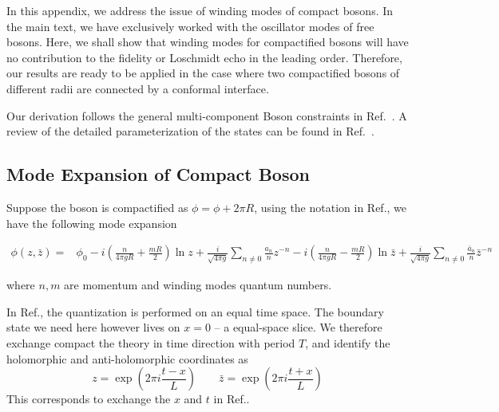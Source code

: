 
In this appendix, we address the issue of winding modes of compact bosons. In the main text, we have exclusively worked with the oscillator modes of free bosons. Here, we shall show that winding modes for compactified bosons will have no contribution to the fidelity or Loschmidt echo in the leading order. Therefore, our results are ready to be applied in the case where two compactified bosons of different radii are connected by a conformal interface\cite{PhysRevLett.118.136801}. 

Our derivation follows the general multi-component Boson constraints in Ref.~. A review of the detailed parameterization of the states can be found in Ref.~. 

\subsection{Mode Expansion of Compact Boson}
Suppose the boson is compactified as $\phi =  \phi + 2\pi R$, using the notation in Ref., we have the following mode expansion 
\begin{widetext}
\begin{equation}
\label{eq:boson-mode-exp}
\begin{aligned}
\phi( z, \bar{z}) = &\phi_0 -i \left( \frac{n}{4\pi g  R} + \frac{m R }{2} \right)  \ln z + \frac{i}{\sqrt{4\pi g}} \sum_{n\ne 0 } \frac{a_n}{n} z^{-n } -i \left( \frac{n}{4\pi g R} - \frac{m R }{2} \right)  \ln \bar{z} + \frac{i}{\sqrt{4\pi g}} \sum_{n\ne 0 } \frac{\bar{a}_n}{n} \bar{z}^{-n } 
\end{aligned}
\end{equation}\end{widetext}
where $n,m$ are momentum and winding modes quantum numbers. 

In Ref., the quantization is performed on an equal time space. The boundary state we need here however lives on $x = 0$ -- a equal-space slice. We therefore exchange compact the theory in time direction with period $T$, and identify the holomorphic and anti-holomorphic coordinates as 
\begin{equation}
\label{eq:zzbar}
z = \exp( 2 \pi i \frac{t - x}{L}) \qquad \bar{z} = \exp( 2 \pi i \frac{t + x}{L})
\end{equation}
This corresponds to exchange the $x$ and $t$ in Ref.. 

